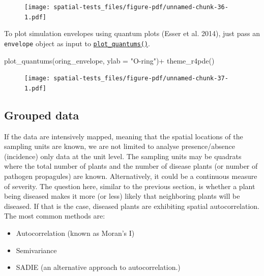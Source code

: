 \documentclass[
  letterpaper,
]{book}
\newenvironment{Shaded}{\begin{snugshade}}{\end{snugshade}}
\newcommand{\AttributeTok}[1]{\textcolor[rgb]{0.40,0.45,0.13}{#1}}
\newcommand{\FunctionTok}[1]{\textcolor[rgb]{0.28,0.35,0.67}{#1}}
\newcommand{\NormalTok}[1]{\textcolor[rgb]{0.00,0.23,0.31}{#1}}
\newcommand{\SpecialCharTok}[1]{\textcolor[rgb]{0.37,0.37,0.37}{#1}}
\newcommand{\StringTok}[1]{\textcolor[rgb]{0.13,0.47,0.30}{#1}}
\begin{document}
\begin{figure}[H]

{\centering \texttt{[image: spatial-tests\_files/figure-pdf/unnamed-chunk-36-1.pdf]}

}

\end{figure}

To plot simulation envelopes using quantum plots (Esser et al. 2014),
just pass an \texttt{envelope} object as input to
\href{https://r-spatialecology.github.io/onpoint/reference/plot_quantums.html}{\texttt{plot\_quantums()}}.

\begin{Shaded}
\begin{Highlighting}[]
\FunctionTok{plot\_quantums}\NormalTok{(oring\_envelope, }\AttributeTok{ylab =} \StringTok{"O{-}ring"}\NormalTok{)}\SpecialCharTok{+}
  \FunctionTok{theme\_r4pde}\NormalTok{()}
\end{Highlighting}
\end{Shaded}

\begin{figure}[H]

{\centering \texttt{[image: spatial-tests\_files/figure-pdf/unnamed-chunk-37-1.pdf]}

}

\end{figure}

\hypertarget{grouped-data}{%
\subsection{Grouped data}\label{grouped-data}}

If the data are intensively mapped, meaning that the spatial locations
of the sampling units are known, we are not limited to analyse
presence/absence (incidence) only data at the unit level. The sampling
units may be quadrats where the total number of plants and the number of
disease plants (or number of pathogen propagules) are known.
Alternatively, it could be a continuous measure of severity. The
question here, similar to the previous section, is whether a plant being
diseased makes it more (or less) likely that neighboring plants will be
diseased. If that is the case, diseased plants are exhibiting spatial
autocorrelation. The most common methods are:

\begin{itemize}
\item
  Autocorrelation (known as Moran's I)
\item
  Semivariance
\item
  SADIE (an alternative approach to autocorrelation.)
\end{itemize}
\end{document}
